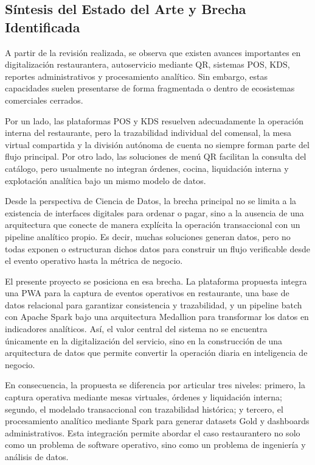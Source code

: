 \subsection{S\'intesis del Estado del Arte y Brecha Identificada}

A partir de la revisi\'on realizada, se observa que existen avances importantes en
digitalizaci\'on restaurantera, autoservicio mediante QR, sistemas POS, KDS, reportes
administrativos y procesamiento anal\'itico. Sin embargo, estas capacidades suelen
presentarse de forma fragmentada o dentro de ecosistemas comerciales cerrados.

Por un lado, las plataformas POS y KDS resuelven adecuadamente la operaci\'on interna del
restaurante, pero la trazabilidad individual del comensal, la mesa virtual compartida y
la divisi\'on aut\'onoma de cuenta no siempre forman parte del flujo principal. Por otro
lado, las soluciones de men\'u QR facilitan la consulta del cat\'alogo, pero usualmente no
integran \'ordenes, cocina, liquidaci\'on interna y explotaci\'on anal\'itica bajo un mismo modelo
de datos.

Desde la perspectiva de Ciencia de Datos, la brecha principal no se limita a la existencia
de interfaces digitales para ordenar o pagar, sino a la ausencia de una arquitectura que
conecte de manera expl\'icita la operaci\'on transaccional con un pipeline anal\'itico propio.
Es decir, muchas soluciones generan datos, pero no todas exponen o estructuran dichos datos
para construir un flujo verificable desde el evento operativo hasta la m\'etrica de negocio.

El presente proyecto se posiciona en esa brecha. La plataforma propuesta integra una PWA
para la captura de eventos operativos en restaurante, una base de datos relacional para
garantizar consistencia y trazabilidad, y un pipeline batch con Apache Spark bajo una
arquitectura Medallion para transformar los datos en indicadores anal\'iticos. As\'i, el valor
central del sistema no se encuentra \'unicamente en la digitalizaci\'on del servicio, sino en
la construcci\'on de una arquitectura de datos que permite convertir la operaci\'on diaria en
inteligencia de negocio.

En consecuencia, la propuesta se diferencia por articular tres niveles: primero, la captura
operativa mediante mesas virtuales, \'ordenes y liquidaci\'on interna; segundo, el modelado
transaccional con trazabilidad hist\'orica; y tercero, el procesamiento anal\'itico mediante
Spark para generar datasets Gold y dashboards administrativos. Esta integraci\'on permite
abordar el caso restaurantero no solo como un problema de software operativo, sino como un
problema de ingenier\'ia y an\'alisis de datos.

\newpage